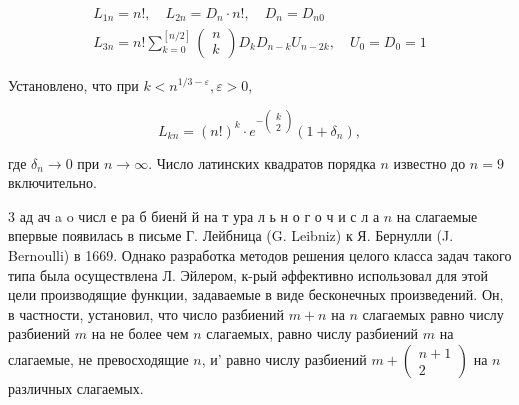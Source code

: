 \documentclass[10pt]{article}
\begin{document}
\[

\begin{gathered}

L_{1 n}=n !, \quad L_{2 n}=D_{n} \cdot n !, \quad D_{n}=D_{n 0} \\

L_{3 n}=n ! \sum_{k=0}^{[n / 2]}\left(\begin{array}{l}

n \\

k

\end{array}\right) D_{k} D_{n-k} U_{n-2 k}, \quad U_{0}=D_{0}=1

\end{gathered}

\]



Установлено, что при $k<n^{1 / 3-\varepsilon}, \varepsilon>0$,



\[

L_{k n}=(n !)^{k} \cdot e^{-\left(\begin{array}{c}

k \\

2

\end{array}\right)}\left(1+\delta_{n}\right),

\]



где $\delta_{n} \rightarrow 0$ при $n \rightarrow \infty$. Число латинских квадратов порядка $n$ известно до $n=9$ включительно.



3 ад ач a o числ е ра б биенй й на т ура л ь н о г о ч и с л а $n$ на слагаемые впервые появилась в письме Г. Лейбница (G. Leibniz) к Я. Бернулли (J. Bernoulli) в 1669. Однако разработка методов решения целого класса задач такого типа была осуществлена Л. Эйлером, к-рый әффективно использовал для этой цели производящие функции, задаваемые в виде бесконечных произведений. Он, в частности, установил, что число разбиений $m+n$ на $n$ слагаемых равно числу разбиений $m$ на не более чем $n$ слагаемых, равно числу разбиений $m$ на слагаемые, не превосходящие $n$, и' равно числу разбиений $m+\left(\begin{array}{c}n+1 \\ 2\end{array}\right)$ на $n$ различных слагаемых.
\end{document}
